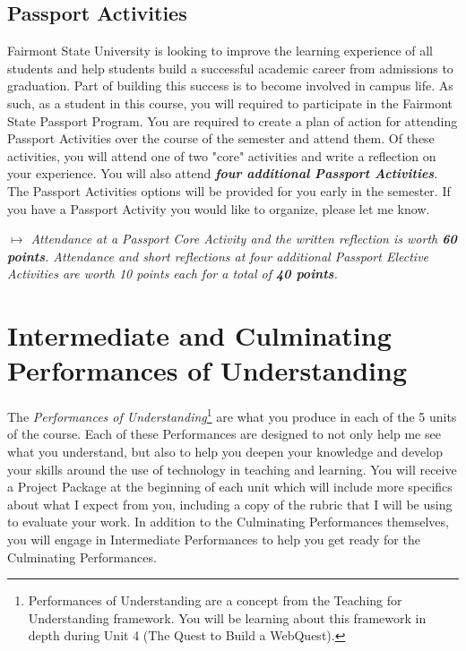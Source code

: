 \documentclass{tufte-handout}
\begin{document}
\subsection{Passport Activities}
Fairmont State University is looking to improve the learning experience of all students and help students build a successful academic career from admissions to graduation. Part of building this success is to become involved in campus life. As such, as a student in this course, you will required to participate in the Fairmont State Passport Program. You are required to create a plan of action for attending Passport Activities over the course of the semester and attend them. Of these activities, you will attend one of two "core" activities and write a reflection on your experience. You will also attend \textit{\textbf{four additional Passport Activities}}. The Passport Activities options will be provided for you early in the semester. If you have a Passport Activity you would like to organize, please let me know.

\medskip\noindent\textit{$\mapsto$ Attendance at a Passport Core Activity and the written reflection is worth \textbf{60 points}. Attendance and short reflections at four additional Passport Elective Activities are worth 10 points each for a total of \textbf{40 points}.}

\section{Intermediate and Culminating Performances of Understanding}

The \textit{Performances of Understanding}\footnote{Performances of Understanding are a concept from the Teaching for Understanding framework. You will be learning about this framework in depth during Unit 4 (The Quest to Build a WebQuest).} are what you produce in each of the 5 units of the course. Each of these Performances are designed to not only help me see what you understand, but also to help you deepen your knowledge and develop your skills around the use of technology in teaching and learning. You will receive a \textsf{Project Package} at the beginning of each unit which will include more specifics about what I expect from you, including a copy of the rubric that I will be using to evaluate your work. In addition to the Culminating Performances themselves, you will engage in Intermediate Performances to help you get ready for the Culminating Performances.
\end{document}
